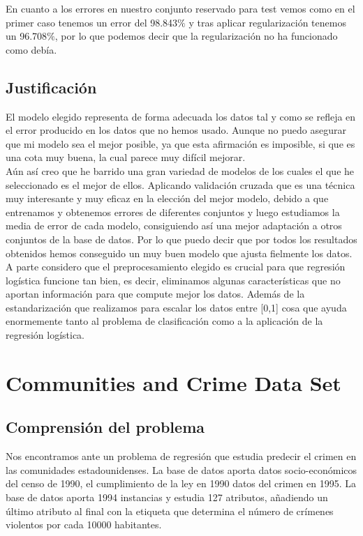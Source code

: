 \documentclass[a4paper,11pt]{article}
\begin{document}
En cuanto a los errores en nuestro conjunto reservado para test vemos como en el primer caso tenemos un error del 98.843$\%$ y tras aplicar regularización tenemos un 96.708$\%$, por lo que podemos decir que la regularización no ha funcionado como debía.

\subsection{Justificación}

El modelo elegido representa de forma adecuada los datos tal y como se refleja en el error producido en los datos que no hemos usado. Aunque no puedo asegurar que mi modelo sea el mejor posible, ya que esta afirmación es imposible, si que es una cota muy buena, la cual parece muy difícil mejorar.\\

Aún así creo que he barrido una gran variedad de modelos de los cuales el que he seleccionado es el mejor de ellos. Aplicando validación cruzada que es una técnica muy interesante y muy eficaz en la elección del mejor modelo, debido a que entrenamos y obtenemos errores de diferentes conjuntos y luego estudiamos la media de error de cada modelo, consiguiendo así una mejor adaptación a otros conjuntos de la base de datos. Por lo que puedo decir que por todos los resultados obtenidos hemos conseguido un muy buen modelo que ajusta fielmente los datos.\\

A parte considero que el preprocesamiento elegido es crucial para que regresión logística funcione tan bien, es decir, eliminamos algunas características que no aportan información para que compute mejor los datos. Además de la estandarización que realizamos para escalar los datos entre [0,1] cosa que ayuda enormemente tanto al problema de clasificación como a la aplicación de la regresión logística.


\section{Communities and Crime Data Set}

\subsection{Comprensión del problema}

Nos encontramos ante un problema de regresión que estudia predecir el crimen en las comunidades estadounidenses. La base de datos aporta datos socio-económicos del censo de 1990, el cumplimiento de la ley en 1990 datos del crimen en 1995. La base de datos aporta 1994 instancias y estudia 127 atributos, añadiendo un último atributo al final con la etiqueta que determina el número de crímenes violentos por cada 10000 habitantes.\\
\end{document}
